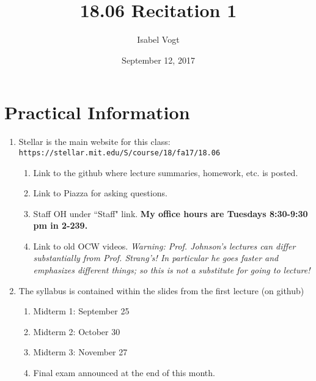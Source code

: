 \documentclass[11pt]{article}
\title{18.06 Recitation 1}
\author{Isabel Vogt}
\date{September 12, 2017}                                           %
\begin{document}
\maketitle

\section{Practical Information}
 \begin{enumerate}
 
 \item Stellar is the main website for this class: \texttt{https://stellar.mit.edu/S/course/18/fa17/18.06}
 
 \begin{enumerate}
 
 \item Link to the github where lecture summaries, homework, etc. is posted.
 
 \item Link to Piazza for asking questions.
 
 \item Staff OH under ``Staff" link.  \textbf{My office hours are Tuesdays 8:30-9:30 pm in 2-239.}
 
 \item Link to old OCW videos.  \textit{Warning: Prof. Johnson's lectures can differ substantially from Prof. Strang's!  In particular he goes faster and emphasizes different things; so this is not a substitute for going to lecture!}
 
 \end{enumerate}
 
 \item The syllabus is contained within the slides from the first lecture (on github)
 \begin{enumerate}
 
 \item Midterm 1: September 25
 
 \item Midterm 2: October 30
 
 \item Midterm 3: November 27

\item Final exam announced at the end of this month. 



\end{enumerate}
\end{enumerate}
\end{document}
